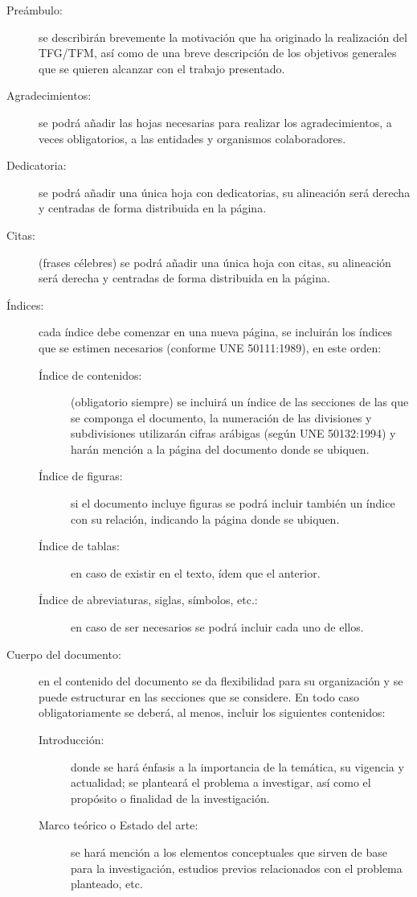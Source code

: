 \begin{description}
\item[Preámbulo:] se describirán brevemente la motivación que ha originado la realización del \ac{TFG}/\acs{TFM}, así como de una breve descripción de los objetivos generales que se quieren alcanzar con el trabajo presentado.
\item[Agradecimientos:] se podrá añadir las hojas necesarias para realizar los agradecimientos, a veces obligatorios, a las entidades y organismos colaboradores.
\item[Dedicatoria:] se podrá añadir una única hoja con dedicatorias, su alineación será derecha y centradas de forma distribuida en la página.
\item[Citas:] (frases célebres) se podrá añadir una única hoja con citas, su alineación será derecha y centradas de forma distribuida en la página.
\item[Índices:] cada índice debe comenzar en una nueva página, se incluirán los índices que se estimen necesarios (conforme UNE 50111:1989), en este orden:
\begin{description}
\item[Índice de contenidos:] (obligatorio siempre) se incluirá un índice de las secciones de las que se componga el documento, la numeración de las 
divisiones y subdivisiones utilizarán cifras arábigas (según UNE 50132:1994) y harán mención a la página del documento donde se ubiquen.
\item[Índice de figuras:] si el documento incluye figuras se podrá incluir también un índice con su relación, indicando la página donde se ubiquen.
\item[Índice de tablas:] en caso de existir en el texto, ídem que el anterior.
\item[Índice de abreviaturas, siglas, símbolos, etc.:] en caso de ser necesarios se podrá incluir cada uno de ellos.
\end{description}
\item[Cuerpo del documento:] en el contenido del documento se da flexibilidad para su organización y se puede estructurar en las secciones que se considere. En todo caso obligatoriamente se deberá, al menos, incluir los siguientes contenidos:
\begin{description}
\item[Introducción:] donde se hará énfasis a la importancia de la temática, su vigencia y actualidad; se planteará el problema a investigar, así como el propósito o finalidad de la investigación.
\item[Marco teórico o Estado del arte:] se hará mención a los elementos conceptuales que sirven de base para la investigación, estudios previos relacionados con el problema planteado, etc.

\end{description}
\end{description}
